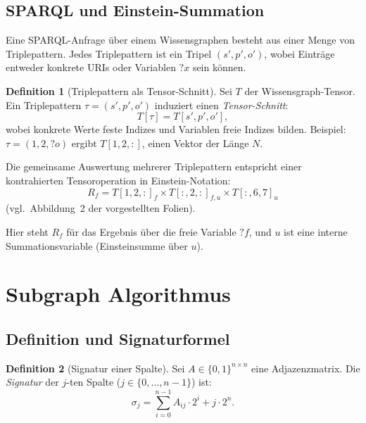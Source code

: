 ﻿\documentclass[a4paper,12pt]{article}
\theoremstyle{definition}
\newtheorem{definition}{Definition}
\begin{document}
\subsection{SPARQL und Einstein-Summation}

Eine SPARQL-Anfrage über einem Wissensgraphen besteht aus einer Menge von
Triplepattern. Jedes Triplepattern ist ein Tripel $(s', p', o')$, wobei Einträge
entweder konkrete URIs oder Variablen $?x$ sein können.

\begin{definition}[Triplepattern als Tensor-Schnitt]
Sei $T$ der Wissensgraph-Tensor. Ein Triplepattern $\tau = (s', p', o')$ induziert
einen \emph{Tensor-Schnitt}:
\[
  T[\tau] = T[s', p', o'],
\]
wobei konkrete Werte feste Indizes und Variablen freie Indizes bilden.
Beispiel: $\tau = (1, 2, {?o})$ ergibt $T[1,2,:]$, einen Vektor der Länge $N$.
\end{definition}

Die gemeinsame Auswertung mehrerer Triplepattern entspricht einer kontrahierten
Tensoroperation in Einstein-Notation:
\[
  R_f = T[1,2,:]_f \times T[:,2,:]_{f,u} \times T[:,6,7]_u
\]
(vgl.\ Abbildung~2 der vorgestellten Folien).

Hier steht $R_f$ für das Ergebnis über die freie Variable $?f$, und $u$ ist eine
interne Summationsvariable (Einsteinsumme über $u$).

\section{Subgraph Algorithmus}
\label{sec:subgraph}

\subsection{Definition und Signaturformel}

\begin{definition}[Signatur einer Spalte]
Sei $A \in \{0,1\}^{n \times n}$ eine Adjazenzmatrix. Die \emph{Signatur} der
$j$-ten Spalte ($j \in \{0,\ldots,n-1\}$) ist:
\[
  \sigma_j = \sum_{i=0}^{n-1} A_{ij} \cdot 2^i + j \cdot 2^n.
\]
\end{definition}
\end{document}
